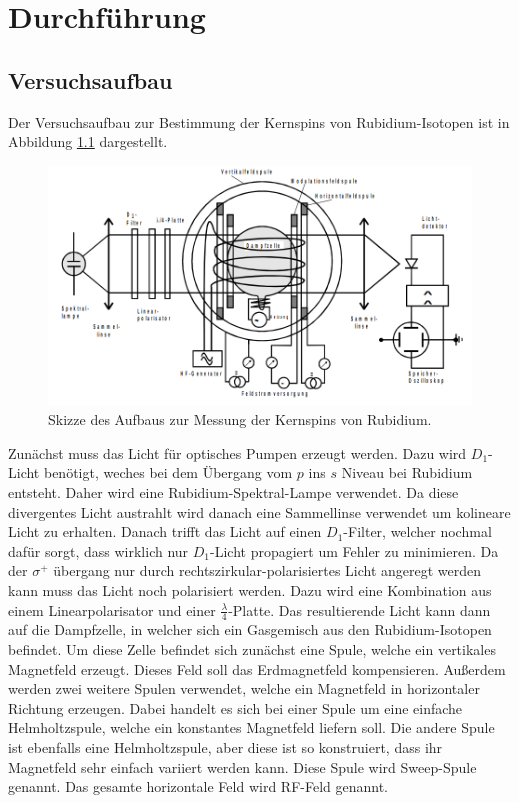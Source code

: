 \chapter{Durchführung}
\label{cha:Durchführung}
\section{Versuchsaufbau}
\label{sec:aufbau}
Der Versuchsaufbau zur Bestimmung der Kernspins von Rubidium-Isotopen ist in Abbildung \ref{fig:aufbau_v21} dargestellt.

\begin{figure}
              \centering
              \includegraphics[width = \textwidth]{content/v21_bilder/aufbau.PNG}
              \caption{Skizze des Aufbaus zur Messung der Kernspins von Rubidium. \cite{v21}}
              \label{fig:aufbau_v21}
\end{figure}

Zunächst muss das Licht für optisches Pumpen erzeugt werden. Dazu wird $D_1$-Licht benötigt, weches bei dem Übergang vom $p$ ins $s$ Niveau bei Rubidium entsteht. Daher wird eine 
Rubidium-Spektral-Lampe verwendet. Da diese divergentes Licht austrahlt wird danach eine Sammellinse verwendet um kolineare Licht zu erhalten. Danach trifft das Licht auf einen 
$D_1$-Filter, welcher nochmal dafür sorgt, dass wirklich nur $D_1$-Licht propagiert um Fehler zu minimieren. Da der $\sigma^+$ übergang nur durch rechtszirkular-polarisiertes Licht 
angeregt werden kann muss das Licht noch polarisiert werden. Dazu wird eine Kombination aus einem Linearpolarisator und einer $\frac{\lambda}{4}$-Platte. Das resultierende Licht kann 
dann auf die Dampfzelle, in welcher sich ein Gasgemisch aus den Rubidium-Isotopen befindet. Um diese Zelle befindet sich zunächst eine Spule, welche ein vertikales Magnetfeld 
erzeugt. Dieses Feld soll das Erdmagnetfeld kompensieren. Außerdem werden zwei weitere Spulen verwendet, welche ein Magnetfeld in horizontaler Richtung erzeugen. Dabei handelt es sich 
bei einer Spule um eine einfache Helmholtzspule, welche ein konstantes Magnetfeld liefern soll. Die andere Spule ist ebenfalls eine Helmholtzspule, aber diese ist so konstruiert, dass
ihr Magnetfeld sehr einfach variiert werden kann. Diese Spule wird Sweep-Spule genannt. Das gesamte horizontale Feld wird RF-Feld genannt.

